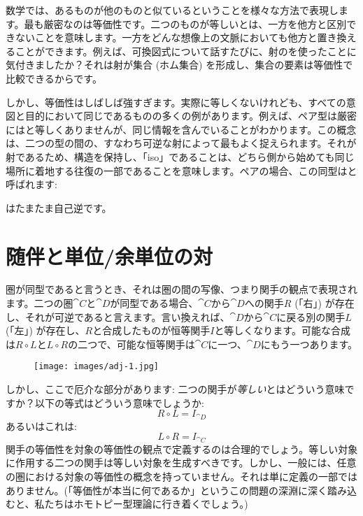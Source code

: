 
\lettrine[lhang=0.17]{数}{学}では、あるものが他のものと似ているということを様々な方法で表現します。最も厳密なのは等価性です。二つのものが等しいとは、一方を他方と区別できないことを意味します。一方をどんな想像上の文脈においても他方と置き換えることができます。例えば、可換図式について話すたびに、射のを使ったことに気付きましたか？それは射が集合 (ホム集合) を形成し、集合の要素は等価性で比較できるからです。

しかし、等価性はしばしば強すぎます。実際に等しくないけれども、すべての意図と目的において同じであるものの多くの例があります。例えば、ペア型は厳密にはと等しくありませんが、同じ情報を含んでいることがわかります。この概念は、二つの型の間の、すなわち可逆な射によって最もよく捉えられます。それが射であるため、構造を保持し、「iso」であることは、どちら側から始めても同じ場所に着地する往復の一部であることを意味します。ペアの場合、この同型はと呼ばれます: 

はたまたま自己逆です。

\section{随伴と単位/余単位の対}

圏が同型であると言うとき、それは圏の間の写像、つまり関手の観点で表現されます。二つの圏$\cat{C}$と$\cat{D}$が同型である場合、$\cat{C}$から$\cat{D}$への関手$R$ (「右」) が存在し、それが可逆であると言えます。言い換えれば、$\cat{D}$から$\cat{C}$に戻る別の関手$L$ (「左」) が存在し、$R$と合成したものが恒等関手$I$と等しくなります。可能な合成は$R \circ L$と$L \circ R$の二つで、可能な恒等関手は$\cat{C}$に一つ、$\cat{D}$にもう一つあります。

\begin{figure}[H]
  \centering
  \texttt{[image: images/adj-1.jpg]}
\end{figure}

\noindent
しかし、ここで厄介な部分があります: 二つの関手が\emph{等しい}とはどういう意味ですか？以下の等式はどういう意味でしょうか: 
\[R \circ L = I_{\cat{D}}\]
あるいはこれは: 
\[L \circ R = I_{\cat{C}}\]
関手の等価性を対象の等価性の観点で定義するのは合理的でしょう。等しい対象に作用する二つの関手は等しい対象を生成すべきです。しかし、一般には、任意の圏における対象の等価性の概念を持っていません。それは単に定義の一部ではありません。(「等価性が本当に何であるか」というこの問題の深淵に深く踏み込むと、私たちはホモトピー型理論に行き着くでしょう。) 

